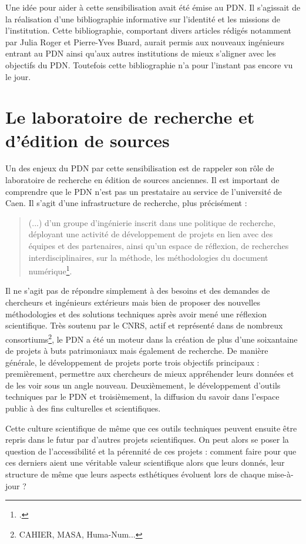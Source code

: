 \documentclass[a4paper,12pt,twoside]{book}
\begin{document}
     
     Une idée pour aider à cette sensibilisation avait été émise au \acrshort{PDN}. Il s'agissait de la réalisation d'une bibliographie informative sur l'identité et les missions de l'institution. Cette bibliographie, comportant divers articles rédigés notamment par Julia Roger et Pierre-Yves Buard, aurait permis aux nouveaux ingénieurs entrant au \acrshort{PDN} ainsi qu'aux autres institutions de mieux s'aligner avec les objectifs du \acrshort{PDN}. Toutefois cette bibliographie n'a pour l'instant pas encore vu le jour.
   

\chapter{Le laboratoire de recherche et d'édition de sources}
    Un des enjeux du \acrshort{PDN} par cette sensibilisation est de rappeler son rôle de laboratoire de recherche en édition de sources anciennes. Il est important de comprendre que le \acrshort{PDN} n'est pas un prestataire au service de l'université de Caen. Il s'agit d'une infrastructure de recherche, plus précisément :
    
    \begin{quote}
    (...) d'un groupe d'ingénierie inscrit dans une politique de recherche, déployant une activité de développement de projets en lien avec des équipes et des partenaires, ainsi qu'un espace de réflexion, de recherches interdisciplinaires, sur la méthode, les méthodologies du document numérique\footcite{noauthor_mrsh-pdn_nodate}.
    \end{quote}
    
Il ne s'agit pas de répondre simplement à des besoins et des demandes de chercheurs et ingénieurs extérieurs mais bien de proposer des nouvelles méthodologies et des solutions techniques après avoir mené une réflexion scientifique. Très soutenu par le \acrshort{CNRS}, actif et représenté dans de nombreux consortiums\footnote{CAHIER, MASA, Huma-Num...}, le \acrshort{PDN} a été un moteur dans la création de plus d'une soixantaine de projets à buts patrimoniaux mais également de recherche. De manière générale, le développement de projets porte trois objectifs principaux : premièrement, permettre aux chercheurs de mieux appréhender leurs données et de les voir sous un angle nouveau. Deuxièmement, le développement d'outils techniques par le \acrshort{PDN} et troisièmement, la diffusion du savoir dans l'espace public à des fins culturelles et scientifiques.

Cette culture scientifique de même que ces outils techniques peuvent ensuite être repris dans le futur par d'autres projets scientifiques. On peut alors se poser la question de l'accessibilité et la pérennité de ces projets : comment faire pour que ces derniers aient une véritable valeur scientifique alors que leurs donnés, leur structure de même que leurs aspects esthétiques évoluent lors de chaque mise-à-jour ? 
    
\end{document}
